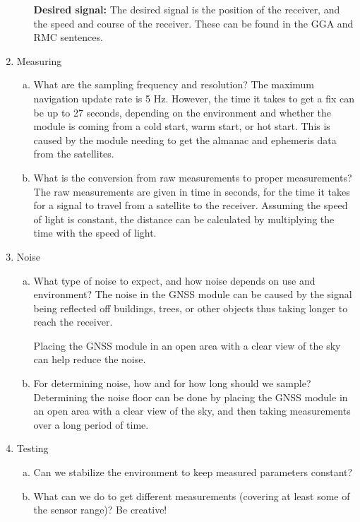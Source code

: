 \begin{enumerate}
\begin{enumerate}[(a)]
        \textbf{Desired signal:}
        The desired signal is the position of the receiver, and the speed and course of the receiver.
        These can be found in the GGA and RMC sentences.%
    \end{enumerate}
    \item Measuring
    \begin{enumerate}[(a)]
        \item What are the sampling frequency and resolution?
        The maximum navigation update rate is 5 Hz. %
        However, the time it takes to get a fix can be up to 27 seconds, depending on the environment and whether the module is coming from a cold start, warm start, or hot start.
        This is caused by the module needing to get the almanac and ephemeris data from the satellites.

        \item What is the conversion from raw measurements to proper measurements?
        The raw measurements are given in time in seconds, for the time it takes for a signal to travel from a satellite to the receiver.
        Assuming the speed of light is constant, the distance can be calculated by multiplying the time with the speed of light.

    \end{enumerate}
    \item Noise
    \begin{enumerate}[(a)]
        \item What type of noise to expect, and how noise depends on use and environment?
        The noise in the GNSS module can be caused by the signal being reflected off buildings, trees, or other objects thus taking longer to reach the receiver.

        Placing the GNSS module in an open area with a clear view of the sky can help reduce the noise.


        \item For determining noise, how and for how long should we sample?
        Determining the noise floor can be done by placing the GNSS module in an open area with a clear view of the sky, and then taking measurements over a long period of time.

    \end{enumerate}
    \item Testing
    \begin{enumerate}[(a)]
        \item Can we stabilize the environment to keep measured parameters constant? %
        \item What can we do to get different measurements (covering at least some of the sensor range)? Be creative!


\end{enumerate}
\end{enumerate}
